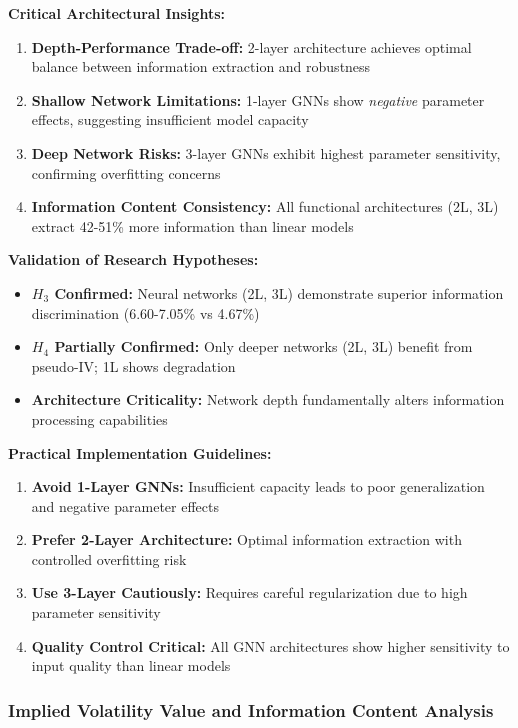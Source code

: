 \documentclass[12pt,a4paper]{article}
\begin{document}
\textbf{Critical Architectural Insights:}
\begin{enumerate}
\item \textbf{Depth-Performance Trade-off:} 2-layer architecture achieves optimal balance between information extraction and robustness
\item \textbf{Shallow Network Limitations:} 1-layer GNNs show \textit{negative} parameter effects, suggesting insufficient model capacity
\item \textbf{Deep Network Risks:} 3-layer GNNs exhibit highest parameter sensitivity, confirming overfitting concerns
\item \textbf{Information Content Consistency:} All functional architectures (2L, 3L) extract 42-51\% more information than linear models
\end{enumerate}

\textbf{Validation of Research Hypotheses:}
\begin{itemize}
\item \textbf{$H_3$ Confirmed:} Neural networks (2L, 3L) demonstrate superior information discrimination (6.60-7.05\% vs 4.67\%)
\item \textbf{$H_4$ Partially Confirmed:} Only deeper networks (2L, 3L) benefit from pseudo-IV; 1L shows degradation
\item \textbf{Architecture Criticality:} Network depth fundamentally alters information processing capabilities
\end{itemize}

\textbf{Practical Implementation Guidelines:}
\begin{enumerate}
\item \textbf{Avoid 1-Layer GNNs:} Insufficient capacity leads to poor generalization and negative parameter effects
\item \textbf{Prefer 2-Layer Architecture:} Optimal information extraction with controlled overfitting risk
\item \textbf{Use 3-Layer Cautiously:} Requires careful regularization due to high parameter sensitivity
\item \textbf{Quality Control Critical:} All GNN architectures show higher sensitivity to input quality than linear models
\end{enumerate}

\subsubsection{Implied Volatility Value and Information Content Analysis}
\end{document}
